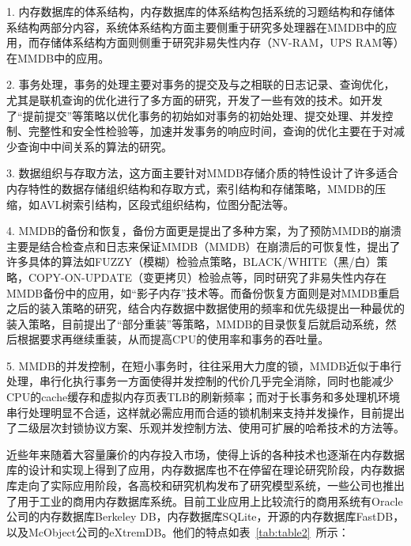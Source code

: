 \documentclass[literaturereview]{zjutreport}
\begin{document}
1. 内存数据库的体系结构，内存数据库的体系结构包括系统的习题结构和存储体系结构两部分内容，系统体系结构方面主要侧重于研究多处理器在MMDB中的应用，而存储体系结构方面则侧重于研究非易失性内存（NV-RAM，UPS RAM等）在MMDB中的应用。

2. 事务处理，事务的处理主要对事务的提交及与之相联的日志记录、查询优化，尤其是联机查询的优化进行了多方面的研究，开发了一些有效的技术。如开发了“提前提交”等策略以优化事务的初始如对事务的初始处理、提交处理、并发控制、完整性和安全性检验等，加速并发事务的响应时间，查询的优化主要在于对减少查询中中间关系的算法的研究。

3. 数据组织与存取方法，这方面主要针对MMDB存储介质的特性设计了许多适合内存特性的数据存储组织结构和存取方式，索引结构和存储策略，MMDB的压缩，如AVL树索引结构，区段式组织结构，位图分配法等。

4. MMDB的备份和恢复，备份方面更是提出了多种方案，为了预防MMDB的崩溃主要是结合检查点和日志来保证MMDB（MMDB）在崩溃后的可恢复性，提出了许多具体的算法如FUZZY（模糊）检验点策略，BLACK/WHITE（黑/白）策略，COPY-ON-UPDATE（变更拷贝）检验点等，同时研究了非易失性内存在MMDB备份中的应用，如“影子内存”技术等。而备份恢复方面则是对MMDB重启之后的装入策略的研究，结合内存数据中数据使用的频率和优先级提出一种最优的装入策略，目前提出了“部分重装”等策略，MMDB的目录恢复后就启动系统，然后根据要求再继续重装，从而提高CPU的使用率和事务的吞吐量。

5. MMDB的并发控制，在短小事务时，往往采用大力度的锁，MMDB近似于串行处理，串行化执行事务一方面使得并发控制的代价几乎完全消除，同时也能减少CPU的cache缓存和虚拟内存页表TLB的刷新频率；而对于长事务和多处理机环境串行处理明显不合适，这样就必需应用而合适的锁机制来支持并发操作，目前提出了二级层次封锁协议方案、乐观并发控制方法、使用可扩展的哈希技术的方法等。

近些年来随着大容量廉价的内存投入市场，使得上诉的各种技术也逐渐在内存数据库的设计和实现上得到了应用，内存数据库也不在停留在理论研究阶段，内存数据库走向了实际应用阶段，各高校和研究机构发布了研究模型系统，一些公司也推出了用于工业的商用内存数据库系统。目前工业应用上比较流行的商用系统有Oracle公司的内存数据库Berkeley DB，内存数据库SQLite，开源的内存数据库FastDB，以及McObject公司的eXtremDB。他们的特点如表~\ref{tab:table2}~所示： 
\end{document}
